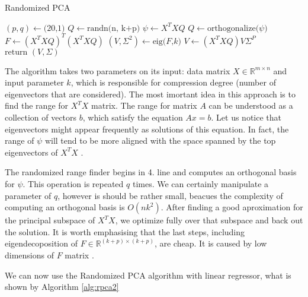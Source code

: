 \begin{algorithm}
    \caption{Randomized PCA}\label{alg:rpca1}
    \begin{algorithmic}[1]
        \State $(p,q) \leftarrow \text{(20,1)}$
        \State $Q \leftarrow \text{randn(n, k+p)}$
            \State $\psi \leftarrow X^TXQ$
            \State $Q \leftarrow \text{orthogonalize($\psi$)}$
            \EndFor
            \State $F \leftarrow (X^TXQ)^T(X^TXQ)$
            \State $(V,\Sigma^2) \leftarrow \text{eig($F$,$k$)}$
            \State $V \leftarrow (X^TXQ)V\Sigma^P$
            \State $\text{return } (V, \Sigma)$
        \EndFunction
    \end{algorithmic}
\end{algorithm}

The algorithm takes two parameters on its input: data matrix $X \in \mathbb{R}^{m \times n}$ and input parameter $k$, which is responsible for compression degree (number of eigenvectors that are considered). The most imortant idea in this approach is to find the range for $X^TX$ matrix. 
The range for matrix $A$ can be understood as a collection of vectors $b$, which satisfy the equation $Ax=b$. Let us notice that eigenvectors might appear frequently as solutions of this equation. In fact, the range of $\psi$ will tend to be more aligned with the space spanned by the top eigenvectors of $X^TX$ \cite{Mineiro}. 

The randomized range finder begins in 4. line and computes an orthogonal basis for $\psi$. This operation is repeated $q$ times. We can certainly manipulate a parameter of $q$, however is should be rather small, beacues the complexity of computing an orthogonal basis is $O(nk^2)$. 
After finding a good aproximation for the principal subspace of $X^TX$, we optimize fully over that subspace and back out the solution. It is worth emphasising that the last steps, including eigendecoposition of $F \in \mathbb{R}^{(k+p) \times (k+p)}$, are cheap. It is caused by low dimensions of $F$ matrix \cite{Mineiro}.

We can now use the Randomized PCA algorithm with linear regressor, what is shown by Algorithm \ref{alg:rpca2} 

